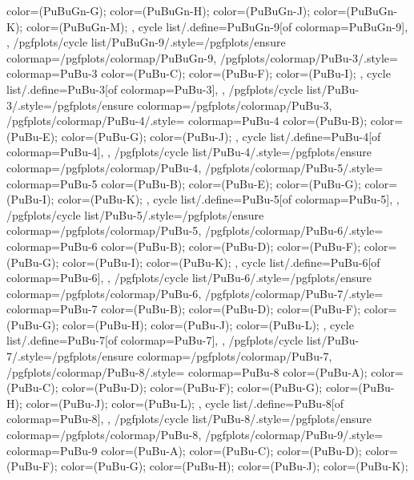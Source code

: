 {{{      color=(PuBuGn-G);
      color=(PuBuGn-H);
      color=(PuBuGn-J);
      color=(PuBuGn-K);
      color=(PuBuGn-M);
    },
    cycle list/.define={PuBuGn-9}{[of colormap=PuBuGn-9]},
  },
  /pgfplots/cycle list/PuBuGn-9/.style={/pgfplots/ensure colormap={/pgfplots/colormap/PuBuGn-9}},
  /pgfplots/colormap/PuBu-3/.style={
    colormap={PuBu-3}{
      color=(PuBu-C);
      color=(PuBu-F);
      color=(PuBu-I);
    },
    cycle list/.define={PuBu-3}{[of colormap=PuBu-3]},
  },
  /pgfplots/cycle list/PuBu-3/.style={/pgfplots/ensure colormap={/pgfplots/colormap/PuBu-3}},
  /pgfplots/colormap/PuBu-4/.style={
    colormap={PuBu-4}{
      color=(PuBu-B);
      color=(PuBu-E);
      color=(PuBu-G);
      color=(PuBu-J);
    },
    cycle list/.define={PuBu-4}{[of colormap=PuBu-4]},
  },
  /pgfplots/cycle list/PuBu-4/.style={/pgfplots/ensure colormap={/pgfplots/colormap/PuBu-4}},
  /pgfplots/colormap/PuBu-5/.style={
    colormap={PuBu-5}{
      color=(PuBu-B);
      color=(PuBu-E);
      color=(PuBu-G);
      color=(PuBu-I);
      color=(PuBu-K);
    },
    cycle list/.define={PuBu-5}{[of colormap=PuBu-5]},
  },
  /pgfplots/cycle list/PuBu-5/.style={/pgfplots/ensure colormap={/pgfplots/colormap/PuBu-5}},
  /pgfplots/colormap/PuBu-6/.style={
    colormap={PuBu-6}{
      color=(PuBu-B);
      color=(PuBu-D);
      color=(PuBu-F);
      color=(PuBu-G);
      color=(PuBu-I);
      color=(PuBu-K);
    },
    cycle list/.define={PuBu-6}{[of colormap=PuBu-6]},
  },
  /pgfplots/cycle list/PuBu-6/.style={/pgfplots/ensure colormap={/pgfplots/colormap/PuBu-6}},
  /pgfplots/colormap/PuBu-7/.style={
    colormap={PuBu-7}{
      color=(PuBu-B);
      color=(PuBu-D);
      color=(PuBu-F);
      color=(PuBu-G);
      color=(PuBu-H);
      color=(PuBu-J);
      color=(PuBu-L);
    },
    cycle list/.define={PuBu-7}{[of colormap=PuBu-7]},
  },
  /pgfplots/cycle list/PuBu-7/.style={/pgfplots/ensure colormap={/pgfplots/colormap/PuBu-7}},
  /pgfplots/colormap/PuBu-8/.style={
    colormap={PuBu-8}{
      color=(PuBu-A);
      color=(PuBu-C);
      color=(PuBu-D);
      color=(PuBu-F);
      color=(PuBu-G);
      color=(PuBu-H);
      color=(PuBu-J);
      color=(PuBu-L);
    },
    cycle list/.define={PuBu-8}{[of colormap=PuBu-8]},
  },
  /pgfplots/cycle list/PuBu-8/.style={/pgfplots/ensure colormap={/pgfplots/colormap/PuBu-8}},
  /pgfplots/colormap/PuBu-9/.style={
    colormap={PuBu-9}{
      color=(PuBu-A);
      color=(PuBu-C);
      color=(PuBu-D);
      color=(PuBu-F);
      color=(PuBu-G);
      color=(PuBu-H);
      color=(PuBu-J);
      color=(PuBu-K);
}}}

